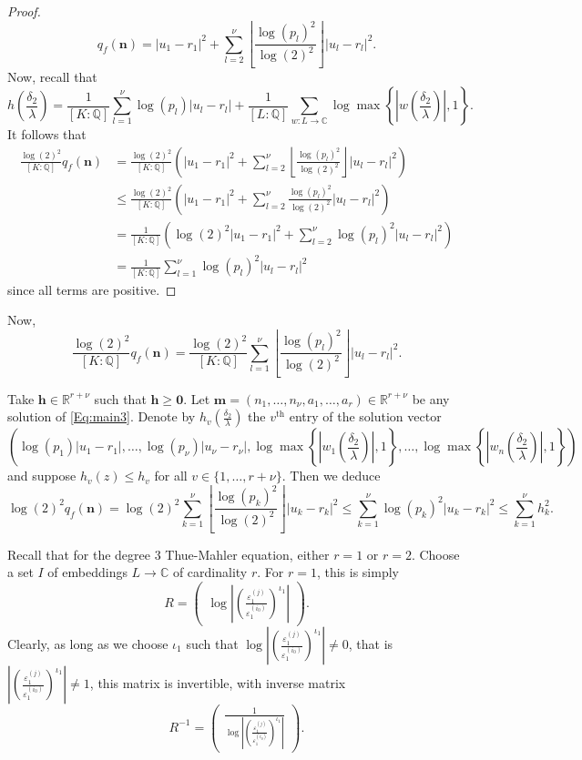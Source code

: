 \begin{proof}
\[ q_f(\mathbf{n}) = |u_1 - r_1|^2 + \sum_{l = 2}^{\nu}\left\lfloor\frac{\log(p_l)^2}{\log(2)^2}\right\rfloor|u_l-r_l|^2.\]
Now, recall that
\[h\left(\frac{\delta_2}{\lambda}\right) = \frac{1}{[K:\mathbb{Q}]}\sum_{l = 1}^{\nu} \log(p_l)|u_l - r_l| + \frac{1}{[L:\mathbb{Q}]}\sum_{w :L \to \mathbb{C}} \log \max \left\{ \left|w\left(\frac{\delta_2}{\lambda}\right)\right|, 1\right\}.\]
It follows that
\begin{align*}
\frac{\log(2)^2}{[K:\mathbb{Q}]}q_f(\mathbf{n}) 
	& = \frac{\log(2)^2}{[K:\mathbb{Q}]}\left( |u_1 - r_1|^2 + \sum_{l = 2}^{\nu} \left\lfloor\frac{\log(p_l)^2}{\log(2)^2}\right\rfloor|u_l -r_l|^2\right) \\
	& \leq \frac{\log(2)^2}{[K:\mathbb{Q}]}\left( |u_1 - r_1|^2 + \sum_{l = 2}^{\nu} \frac{\log(p_l)^2}{\log(2)^2}|u_l -r_l|^2\right) \\
	& = \frac{1}{[K:\mathbb{Q}]}\left( \log(2)^2|u_1 - r_1|^2 + \sum_{l = 2}^{\nu} \log(p_l)^2|u_l -r_l|^2\right) \\
	& = \frac{1}{[K:\mathbb{Q}]}\sum_{l = 1}^{\nu}\log(p_l)^2|u_l -r_l|^2
\end{align*}
since all terms are positive. 
\end{proof}

Now, 
\[\frac{\log(2)^2}{[K:\mathbb{Q}]}q_f(\mathbf{n}) =  \frac{\log(2)^2}{[K:\mathbb{Q}]} \sum_{l = 1}^{\nu}\left\lfloor\frac{\log(p_l)^2}{\log(2)^2}\right\rfloor|u_l-r_l|^2.\]

Take $\mathbf{h}\in\mathbb{R}^{r+\nu}$ such that $\mathbf{h}\geq \mathbf{0}$. Let $\mathbf{m} = (n_1, \dots, n_{\nu}, a_1, \dots, a_r) \in \mathbb{R}^{r + \nu}$ be any solution of \eqref{Eq:main3}. Denote by $h_{v}\left(\frac{\delta_2}{\lambda}\right)$ the $v^{\text{th}}$ entry of the solution vector
\[\left(\log(p_1)|u_1 - r_1|, \dots, \log(p_{\nu})|u_{\nu} - r_{\nu}|, \log \max \left\{ \left|w_1\left(\frac{\delta_2}{\lambda}\right)\right|, 1\right\}, \dots, \log \max \left\{ \left|w_n\left(\frac{\delta_2}{\lambda}\right)\right|, 1\right\}  \right)\] 
and suppose $h_v(z)\leq h_v$ for all $v\in \{1, \dots, r+\nu\}$. Then we deduce
\[\log(2)^2q_f(\mathbf{n}) = \log(2)^2\sum_{k = 1}^{\nu}\left\lfloor\frac{\log(p_k)^2}{\log(2)^2}\right\rfloor|u_k-r_k|^2 \leq \sum_{k = 1}^{\nu} \log(p_k)^2|u_k -r_k|^2 \leq \sum_{k = 1}^{\nu} h_k^2.\]

Recall that for the degree $3$ Thue-Mahler equation, either $r = 1$ or $r = 2$. Choose a set $I$ of embeddings $L \rightarrow \mathbb{C}$ of cardinality $r$. For $r = 1$, this is simply
\[R = \begin{pmatrix}
	\log\left|\left(\frac{\varepsilon_1^{(j)}}{\varepsilon_1^{(i_0)}}\right)^{\iota_1}\right| \end{pmatrix}.\]
Clearly, as long as we choose $\iota_1$ such that $\log\left|\left(\frac{\varepsilon_1^{(j)}}{\varepsilon_1^{(i_0)}}\right)^{\iota_1}\right| \neq 0$, that is $\left|\left(\frac{\varepsilon_1^{(j)}}{\varepsilon_1^{(i_0)}}\right)^{\iota_1}\right| \neq 1$, this matrix is invertible, with inverse matrix
\[R^{-1} = \begin{pmatrix} \frac{1}{\log\left|\left(\frac{\varepsilon_1^{(j)}}{\varepsilon_1^{(i_0)}}\right)^{\iota_1}\right|}\end{pmatrix}.\]

